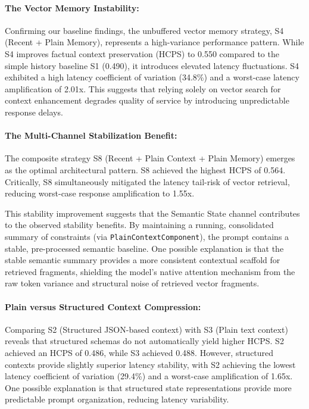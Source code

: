 \documentclass[11pt,journal,onecolumn]{article}
\begin{document}
\paragraph{The Vector Memory Instability:}
Confirming our baseline findings, the unbuffered vector memory strategy, S4 (Recent + Plain Memory), represents a high-variance performance pattern. While S4 improves factual context preservation (HCPS) to 0.550 compared to the simple history baseline S1 (0.490), it introduces elevated latency fluctuations. S4 exhibited a high latency coefficient of variation (34.8\%) and a worst-case latency amplification of 2.01x. This suggests that relying solely on vector search for context enhancement degrades quality of service by introducing unpredictable response delays.

\paragraph{The Multi-Channel Stabilization Benefit:}
The composite strategy S8 (Recent + Plain Context + Plain Memory) emerges as the optimal architectural pattern. S8 achieved the highest HCPS of 0.564. Critically, S8 simultaneously mitigated the latency tail-risk of vector retrieval, reducing worst-case response amplification to 1.55x. 

This stability improvement suggests that the Semantic State channel contributes to the observed stability benefits. By maintaining a running, consolidated summary of constraints (via \texttt{PlainContextComponent}), the prompt contains a stable, pre-processed semantic baseline. One possible explanation is that the stable semantic summary provides a more consistent contextual scaffold for retrieved fragments, shielding the model's native attention mechanism from the raw token variance and structural noise of retrieved vector fragments.

\paragraph{Plain versus Structured Context Compression:}
Comparing S2 (Structured JSON-based context) with S3 (Plain text context) reveals that structured schemas do not automatically yield higher HCPS. S2 achieved an HCPS of 0.486, while S3 achieved 0.488. However, structured contexts provide slightly superior latency stability, with S2 achieving the lowest latency coefficient of variation (29.4\%) and a worst-case amplification of 1.65x. One possible explanation is that structured state representations provide more predictable prompt organization, reducing latency variability.
\end{document}
